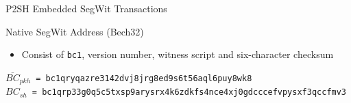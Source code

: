 \documentclass[]{beamer}
\begin{document}
\begin{frame}{P2SH Embedded SegWit Transactions}

	\begin{figure}
			
	\end{figure}
	\vspace{1.5em}
	
	\vspace{1em}
	
	\end{frame}

\begin{frame}{Native SegWit Address (Bech32)}
	\begin{itemize}
		\item Consist of \texttt{bc1}, version number, witness script and six-character checksum	
	\end{itemize}
	
	\vspace{1.5em}
	
	\begin{scriptsize}
		\texttt{$\overline{BC}_{pkh}$ = bc1qryqazre3142dvj8jrg8ed9s6t56aql6puy8wk8}\\
		\texttt{$BC_{sh}$ = bc1qrp33g0q5c5txsp9arysrx4k6zdkfs4nce4xj0gdcccefvpysxf3qccfmv3}
	\end{scriptsize}
\end{frame}
\end{document}
